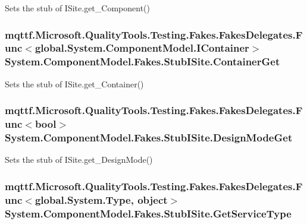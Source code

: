Sets the stub of I\-Site.\-get\-\_\-\-Component()

\hypertarget{class_system_1_1_component_model_1_1_fakes_1_1_stub_i_site_af0d11cbd6a6b131afe1b093ade929ea2}{
\subsubsection[{Container\-Get}]{\setlength{\rightskip}{0pt plus 5cm}mqttf.\-Microsoft.\-Quality\-Tools.\-Testing.\-Fakes.\-Fakes\-Delegates.\-Func$<$global.\-System.\-Component\-Model.\-I\-Container$>$ System.\-Component\-Model.\-Fakes.\-Stub\-I\-Site.\-Container\-Get}}\label{class_system_1_1_component_model_1_1_fakes_1_1_stub_i_site_af0d11cbd6a6b131afe1b093ade929ea2}


Sets the stub of I\-Site.\-get\-\_\-\-Container()

\hypertarget{class_system_1_1_component_model_1_1_fakes_1_1_stub_i_site_a8342b1e21c6143d6ca910c5ed9712fb3}{
\subsubsection[{Design\-Mode\-Get}]{\setlength{\rightskip}{0pt plus 5cm}mqttf.\-Microsoft.\-Quality\-Tools.\-Testing.\-Fakes.\-Fakes\-Delegates.\-Func$<$bool$>$ System.\-Component\-Model.\-Fakes.\-Stub\-I\-Site.\-Design\-Mode\-Get}}\label{class_system_1_1_component_model_1_1_fakes_1_1_stub_i_site_a8342b1e21c6143d6ca910c5ed9712fb3}


Sets the stub of I\-Site.\-get\-\_\-\-Design\-Mode()

\hypertarget{class_system_1_1_component_model_1_1_fakes_1_1_stub_i_site_a862c1888cbf7134c25897772e9d3d78c}{
\subsubsection[{Get\-Service\-Type}]{\setlength{\rightskip}{0pt plus 5cm}mqttf.\-Microsoft.\-Quality\-Tools.\-Testing.\-Fakes.\-Fakes\-Delegates.\-Func$<$global.\-System.\-Type, object$>$ System.\-Component\-Model.\-Fakes.\-Stub\-I\-Site.\-Get\-Service\-Type}}\label{class_system_1_1_component_model_1_1_fakes_1_1_stub_i_site_a862c1888cbf7134c25897772e9d3d78c}


